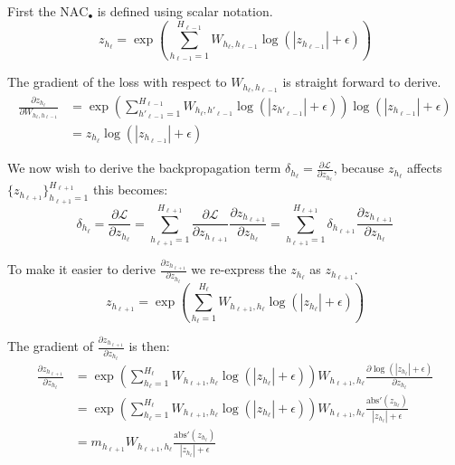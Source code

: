 First the $\textrm{NAC}_\bullet$ is defined using scalar notation.
\begin{equation}
z_{h_\ell} = \exp\left(\sum_{h_{\ell-1}=1}^{H_{\ell-1}} W_{h_{\ell}, h_{\ell-1}} \log(|z_{h_{\ell-1}}| + \epsilon) \right)
\end{equation}

The gradient of the loss with respect to $W_{h_\ell, h_{\ell-1}}$ is straight forward to derive.
\begin{equation}
\begin{aligned}
\frac{\partial z_{h_\ell}}{\partial W_{h_\ell, h_{\ell-1}}} &= \exp\left(\sum_{h'_{\ell-1}=1}^{H_{\ell-1}} W_{h_{\ell}, h'_{\ell-1}} \log(|z_{h'_{\ell-1}}| + \epsilon) \right) \log(|z_{h_{\ell-1}}| + \epsilon) \\
&= z_{h_\ell} \log(|z_{h_{\ell-1}}| + \epsilon)
\end{aligned}
\end{equation}

We now wish to derive the backpropagation term $\delta_{h_\ell} = \frac{\partial \mathcal{L}}{\partial z_{h_\ell}}$, because $z_{h_\ell}$ affects $\{z_{h_{\ell+1}}\}_{h_{\ell+1}=1}^{H_{\ell+1}}$ this becomes:
\begin{equation}
\delta_{h_\ell} = \frac{\partial \mathcal{L}}{\partial z_{h_\ell}} = \sum_{h_{\ell+1}=1}^{H_{\ell+1}} \frac{\partial \mathcal{L}}{\partial z_{h_{\ell+1}}} \frac{\partial z_{h_{\ell+1}}}{\partial z_{h_\ell}} = \sum_{h_{\ell+1}=1}^{H_{\ell+1}} \delta_{h_{\ell+1}} \frac{\partial z_{h_{\ell+1}}}{\partial z_{h_\ell}}
\end{equation}

To make it easier to derive $\frac{\partial z_{h_{\ell+1}}}{\partial z_{h_\ell}}$ we re-express the $z_{h_\ell}$ as $z_{h_{\ell+1}}$.
\begin{equation}
z_{h_{\ell+1}} = \exp\left(\sum_{h_{\ell}=1}^{H_{\ell}} W_{h_{\ell+1}, h_{\ell}} \log(|z_{h_{\ell}}| + \epsilon) \right)
\end{equation}

The gradient of $\frac{\partial z_{h_{\ell+1}}}{\partial z_{h_\ell}}$ is then:
\begin{equation}
\begin{aligned}
\frac{\partial z_{h_{\ell+1}}}{\partial z_{h_\ell}} &= \exp\left(\sum_{h_{\ell}=1}^{H_{\ell}} W_{h_{\ell+1}, h_{\ell}} \log(|z_{h_{\ell}}| + \epsilon) \right) W_{h_{\ell+1}, h_{\ell}} \frac{\partial \log(|z_{h_{\ell}}| + \epsilon)}{\partial z_{h_\ell}} \\
&= \exp\left(\sum_{h_{\ell}=1}^{H_{\ell}} W_{h_{\ell+1}, h_{\ell}} \log(|z_{h_{\ell}}| + \epsilon) \right) W_{h_{\ell+1}, h_{\ell}} \frac{\mathrm{abs}'(z_{h_{\ell}})}{|z_{h_{\ell}}| + \epsilon} \\
&= m_{h_{\ell+1}} W_{h_{\ell+1}, h_{\ell}} \frac{\mathrm{abs}'(z_{h_{\ell}})}{|z_{h_{\ell}}| + \epsilon} 
\end{aligned}
\end{equation}

